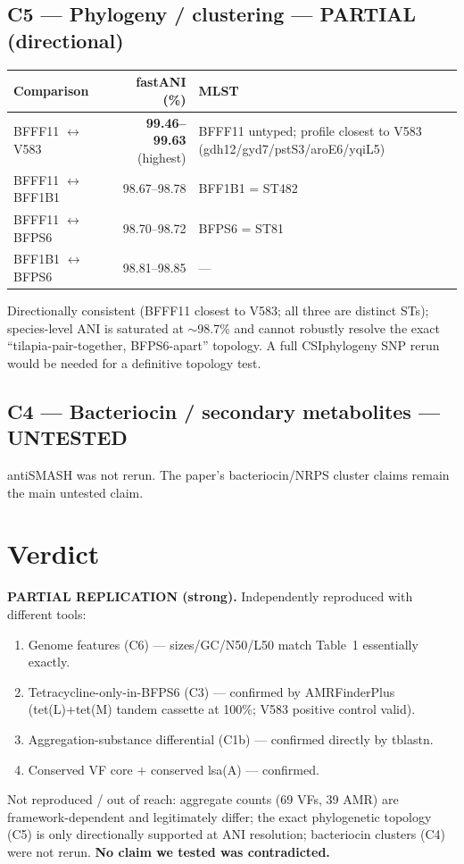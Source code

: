 \documentclass[11pt]{article}
\begin{document}
\subsection{C5 --- Phylogeny / clustering --- PARTIAL (directional)}
\begin{longtable}{@{}lrl@{}}
\toprule
Comparison & fastANI (\%) & MLST \\
\midrule
BFFF11 $\leftrightarrow$ V583  & \textbf{99.46--99.63} (highest) & BFFF11 untyped; profile closest to V583 (gdh12/gyd7/pstS3/aroE6/yqiL5) \\
BFFF11 $\leftrightarrow$ BFF1B1 & 98.67--98.78 & BFF1B1 = ST482 \\
BFFF11 $\leftrightarrow$ BFPS6  & 98.70--98.72 & BFPS6 = ST81 \\
BFF1B1 $\leftrightarrow$ BFPS6  & 98.81--98.85 & --- \\
\bottomrule
\end{longtable}
Directionally consistent (BFFF11 closest to V583; all three are distinct STs); species-level ANI is saturated at $\sim$98.7\% and cannot robustly resolve the exact ``tilapia-pair-together, BFPS6-apart'' topology. A full CSIphylogeny SNP rerun would be needed for a definitive topology test.

\subsection{C4 --- Bacteriocin / secondary metabolites --- UNTESTED}
antiSMASH was not rerun. The paper's bacteriocin/NRPS cluster claims remain the main untested claim.

\section{Verdict}
\textbf{PARTIAL REPLICATION (strong).} Independently reproduced with different tools:
\begin{enumerate}
\item Genome features (C6) --- sizes/GC/N50/L50 match Table~1 essentially exactly.
\item Tetracycline-only-in-BFPS6 (C3) --- confirmed by AMRFinderPlus (tet(L)+tet(M) tandem cassette at 100\%; V583 positive control valid).
\item Aggregation-substance differential (C1b) --- confirmed directly by tblastn.
\item Conserved VF core + conserved lsa(A) --- confirmed.
\end{enumerate}
Not reproduced / out of reach: aggregate counts (69 VFs, 39 AMR) are framework-dependent and legitimately differ; the exact phylogenetic topology (C5) is only directionally supported at ANI resolution; bacteriocin clusters (C4) were not rerun. \textbf{No claim we tested was contradicted.}
\end{document}
